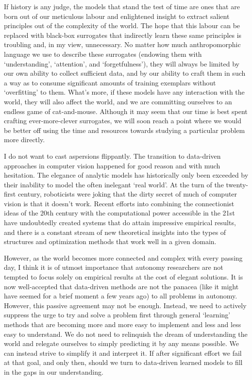 If history is any judge, the models that stand the test of time are ones that are born out of our meticulous labour and enlightened insight to extract salient principles out of the complexity of the world. The hope that this labour can be replaced with black-box surrogates that indirectly learn these same principles is troubling and, in my view, unnecessary. No matter how much anthropomorphic language we use to describe these surrogates (endowing them with `understanding', `attention', and `forgetfulness'), they will always be limited by our own ability to collect sufficient data, and by our ability to craft them in such a way as to consume significant amounts of training exemplars without `overfitting' to them. What's more, if these models have any interaction with the world, they will also affect the world, and we are committing ourselves to an endless game of cat-and-mouse. Although it may seem that our time is best spent crafting ever-more-clever surrogates, we will soon reach a point where we would be better off using the time and resources towards studying a particular problem more directly.

I do not want to cast aspersions flippantly.  The transition to data-driven approaches in computer vision happened for good reason and with much hesitation. The elegance of analytic models has historically only been exceeded by their inability to model the often inelegant `real world'. At the turn of the twenty-first century, roboticists were joking that the dirty secret of much of computer vision is that it doesn't work. Recent efforts into combining the connectionist ideas of the 20th century with the computational power accessible in the 21st have undoubtedly created systems that do attain impressive empirical results, and there is a constant stream of new theoretical insights into the types of structures	 and optimization methods that work well in a given domain.

However, as the world becomes more connected and complex with every passing day, I think it is of utmost importance that autonomy researchers are not tempted to focus solely on empirical results at the cost of elegant solutions. It is now well-accepted that data-driven methods are not the panacea (like it might have seemed for a brief moment a few years ago) to all problems in autonomy. However, this passive agreement may not be enough. Instead, we need to actively suppress the urge to try and solve a problem first through general `learning' methods that are becoming more and more easy to implement and less and less easy to understand.  We do not need to relinquish the dream of understanding the world and relegate ourselves to simply predicting it by any means possible. We can instead strive to simplify it and interpret it. If after significant effort we fail at that goal, and only then, should we turn to data-driven learned models to fill in the gaps in our understanding.

